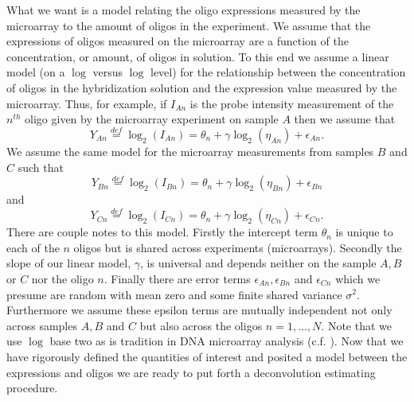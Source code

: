 \documentclass[reqno,12pt,oneside]{report}\usepackage[]{graphicx}\usepackage[]{color}
\theoremstyle{plain}
\theoremstyle{definition}
\theoremstyle{remark}
\numberwithin{theorem}{chapter}     %
\begin{document}
What we want is a model relating the oligo expressions measured by the microarray to the amount of oligos in the experiment. We assume that the expressions of oligos measured on the microarray are a function of the concentration, or amount, of oligos in solution. To this end we assume a linear model (on a $\log$ versus $\log$ level) for the relationship between the concentration of oligos in the hybridization solution and the expression value measured by the microarray. Thus, for example, if $I_{An}$ is the probe intensity measurement of the $n^{th}$ oligo given by the microarray experiment on sample $A$ then we assume that 
\[
Y_{An}\overset{def}{=}\log_2\left(I_{An}\right) = \theta_n + \gamma\log_2\left(\eta_{An}\right) + \epsilon_{An}.
\]
We assume the same model for the microarray measurements from samples $B$ and $C$ such that 
\[
Y_{Bn}\overset{def}{=}\log_2\left(I_{Bn}\right) = \theta_n + \gamma\log_2\left(\eta_{Bn}\right) + \epsilon_{Bn}
\]
and 
\[
Y_{Cn}\overset{def}{=}\log_2\left(I_{Cn}\right) = \theta_n + \gamma\log_2\left(\eta_{Cn}\right) + \epsilon_{Cn}.
\]
There are couple notes to this model. Firstly the intercept term $\theta_n$ is unique to each of the $n$ oligos but is shared across experiments (microarrays). Secondly the slope of our linear model, $\gamma$, is universal and depends neither on the sample $A,B$ or $C$ nor the oligo $n$. Finally there are error terms $\epsilon_{An},\epsilon_{Bn}$ and $\epsilon_{Cn}$ which we presume are random with mean zero and some finite shared variance $\sigma^2$. Furthermore we assume these epsilon terms are mutually independent not only across samples $A,B$ and $C$ but also across the oligos $n=1,\ldots,N$. Note that we use $\log$ base two as is tradition in DNA microarray analysis (c.f. \citeauthor{Irizarry2003} \citeyear{Irizarry2003}). Now that we have rigorously defined the quantities of interest and posited a model between the expressions and oligos we are ready to put forth a deconvolution estimating procedure. 
\end{document}
